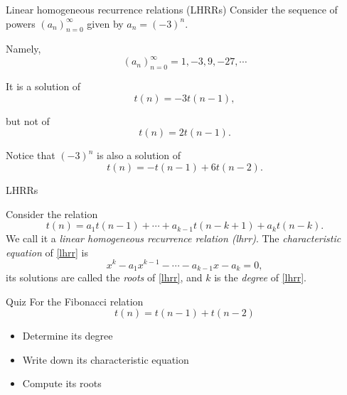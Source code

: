 \documentclass{beamer}
\begin{document}
%

\begin{frame}{Linear homogeneous recurrence relations (LHRRs)}
	Consider the sequence of powers $(a_n)_{n=0}^\infty$ given by $a_n = (-3)^n$.

	\bigskip
	Namely,
	\begin{equation*}
		(a_n)_{n=0}^\infty = 1, -3, 9, -27, \cdots
	\end{equation*}\pause

	It is a solution of 
	\begin{displaymath}
		t(n)= -3t(n-1),
	\end{displaymath} 

	but not of
	\begin{displaymath}
		t(n)= 2t(n-1).
	\end{displaymath}\pause

	Notice that $(-3)^n$ is also a solution of
	\begin{displaymath}
		t(n)= -t(n-1) + 6t(n-2).
	\end{displaymath}
\end{frame}

%

\begin{frame}{LHRRs}
	\begin{defn}
		Consider the relation
		\begin{equation}\label{lhrr}
			t(n)= a_1t(n-1) + \cdots + a_{k-1}t(n-k+1) + a_kt(n-k).
		\end{equation}\pause
		We call it a \emph{linear homogeneous recurrence relation (lhrr)}.\pause
		The \emph{characteristic equation} of \eqref{lhrr} is
		\begin{equation}\label{cheq}
			x^k - a_1x^{k-1} - \cdots - a_{k-1}x - a_k = 0,
		\end{equation}\pause
		its solutions are called the \emph{roots} of \eqref{lhrr}, and $k$ is
		the \emph{degree} of \eqref{lhrr}.
	\end{defn}
\end{frame}

%

\begin{frame}{Quiz}\pause
		For the Fibonacci relation
		\begin{equation*}
			t(n)= t(n-1) + t(n-2)
		\end{equation*}
		\begin{itemize}
			\item Determine its degree
			\item Write down its characteristic equation
			\item Compute its roots
		\end{itemize}
\end{frame}
\end{document}
